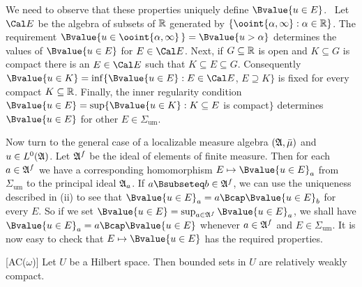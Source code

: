 {\medskip

 We need to observe that these properties uniquely define
$\Bvalue{u\in E}$.   \Prf\ Let $\Cal E$ be the algebra of subsets of
$\Bbb R$ generated by $\{\ooint{\alpha,\infty}:\alpha\in\Bbb R\}$.
The requirement
$\Bvalue{u\in\ooint{\alpha,\infty}\,}=\Bvalue{u>\alpha}$
determines the values of $\Bvalue{u\in E}$ for $E\in\Cal E$.
Next, if $G\subseteq\Bbb R$ is open and
$K\subseteq G$ is compact there is an $E\in\Cal E$ such that
$K\subseteq E\subseteq G$.   Consequently
$\Bvalue{u\in K}=\inf\{\Bvalue{u\in E}:E\in\Cal E$, $E\supseteq K\}$
is fixed for every compact $K\subseteq\Bbb R$.   Finally, the inner
regularity condition
$\Bvalue{u\in E}=\sup\{\Bvalue{u\in K}:K\subseteq E$ is compact$\}$
determines $\Bvalue{u\in E}$ for other $E\in\Sigma_{\text{um}}$.\ \Qed

\medskip

 Now turn to the general case of a localizable measure
algebra $(\frak A,\bar\mu)$ and $u\in L^0(\frak A)$.   Let $\frak A^f$ be
the ideal of elements of finite measure.   Then for each $a\in\frak A^f$ we
have a corresponding homomorphism
$E\mapsto\Bvalue{u\in E}_a$ from $\Sigma_{\text{um}}$ to the principal
ideal $\frak A_a$.   If $a\Bsubseteq b\in\frak A^f$, we can use the
uniqueness described in (ii) to see that
$\Bvalue{u\in E}_a=a\Bcap\Bvalue{u\in E}_b$ for every $E$.   So if we set
$\Bvalue{u\in E}=\sup_{a\in\frak A^f}\Bvalue{u\in E}_a$, we shall have
$\Bvalue{u\in E}_a=a\Bcap\Bvalue{u\in E}$ whenever $a\in\frak A^f$ and
$E\in\Sigma_{\text{um}}$.   It is now easy to check that
$E\mapsto\Bvalue{u\in E}$ has the required properties.
}%

 [AC($\omega$)] Let $U$ be a Hilbert space.   Then
bounded sets in $U$ are relatively weakly compact.

